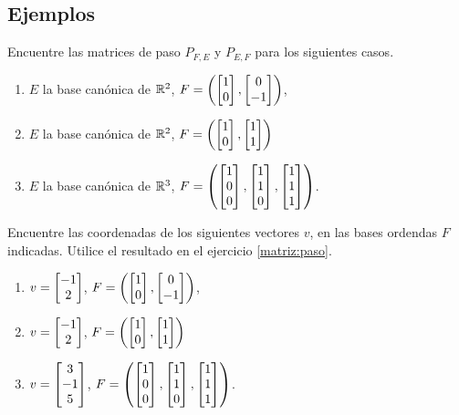 \subsection*{Ejemplos}

\begin{problema}
 \label{matriz:paso}
 Encuentre las matrices de paso $P_{F,E}$ y $P_{E,F}$ para los siguientes casos.
  \begin{enumerate}
  \item $E$ la base canónica de $\mathbb{R}^{2}$, $F=\left(\begin{bmatrix}1\\0\end{bmatrix},\begin{bmatrix}0\\-1\end{bmatrix}\right)$,
  \item $E$ la base canónica de $\mathbb{R}^{2}$, $F=\left(\begin{bmatrix}1\\0\end{bmatrix},\begin{bmatrix}1\\1\end{bmatrix}\right)$
  \item $E$ la base canónica de $\mathbb{R}^{3}$, $F=\left(\begin{bmatrix}1\\0\\0\end{bmatrix},\begin{bmatrix}1\\1\\0\end{bmatrix},\begin{bmatrix}1\\1\\1\end{bmatrix}\right)$.
 \end{enumerate}

\end{problema}


\begin{problema}
 Encuentre las coordenadas de los siguientes vectores $v$, en las bases ordendas $F$ indicadas. Utilice el resultado en
el ejercicio \ref{matriz:paso}.
 \begin{enumerate}
  \item $v=\begin{bmatrix}-1\\2\end{bmatrix}$, $F=\left(\begin{bmatrix}1\\0\end{bmatrix},\begin{bmatrix}0\\-1\end{bmatrix}\right)$,
  \item $v=\begin{bmatrix}-1\\2\end{bmatrix}$, $F=\left(\begin{bmatrix}1\\0\end{bmatrix},\begin{bmatrix}1\\1\end{bmatrix}\right)$
  \item $v=\begin{bmatrix}3\\-1\\5\end{bmatrix}$, $F=\left(\begin{bmatrix}1\\0\\0\end{bmatrix},\begin{bmatrix}1\\1\\0\end{bmatrix},\begin{bmatrix}1\\1\\1\end{bmatrix}\right)$.
 \end{enumerate}

\end{problema}

